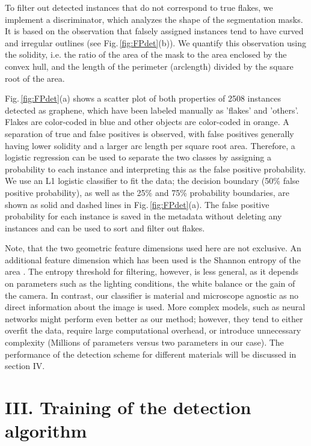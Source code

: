 \documentclass[reprint, prl, superscriptaddress, floatfix]{revtex4-2}
\newcommand{\fig}[1]{Fig.\,\ref{#1}}
\begin{document}
To filter out detected instances that do not correspond to true flakes, we implement a discriminator, which analyzes the shape of the segmentation masks.
It is based on the observation that falsely assigned instances tend to have curved and irregular outlines (see \fig{fig:FPdet}(b)). 
We quantify this observation using the solidity, i.e. the ratio of the area of the mask to the area enclosed by the convex hull, and the length of the perimeter (arclength) divided by the square root of the area.

\fig{fig:FPdet}(a) shows a scatter plot of both properties of 2508 instances detected as graphene, which have been labeled manually as 'flakes' and 'others'.
Flakes are color-coded in blue and other objects are color-coded in orange. 
A separation of true and false positives is observed, with false positives generally having lower solidity and a larger arc length per square root area. 
Therefore, a logistic regression can be used to separate the two classes by assigning a probability to each instance and interpreting this as the false positive probability.
We use an L1 logistic classifier to fit the data; the decision boundary (50\% false positive probability), as well as the 25\% and 75\% probability boundaries, are shown as solid and dashed lines in \fig{fig:FPdet}(a). 
The false positive probability for each instance is saved in the metadata without deleting any instances and can be used to sort and filter out flakes. 

Note, that the two geometric feature dimensions used here are not exclusive. 
An additional feature dimension which has been used is the Shannon entropy of the area \cite{Masubuchi2018}.
The entropy threshold for filtering, however, is less general, as it depends on parameters such as the lighting conditions, the white balance or the gain of the camera. 
In contrast, our classifier is material and microscope agnostic as no direct information about the image is used.
More complex models, such as neural networks might perform even better as our method; however, they tend to either overfit the data, require large computational overhead, or introduce unnecessary complexity (Millions of parameters versus two parameters in our case).
The performance of the detection scheme for different materials  will be discussed in section IV.

\section{III. Training of the detection algorithm}
\end{document}

